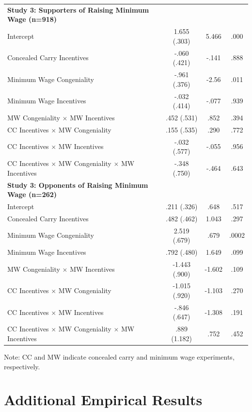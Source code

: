 \documentclass[12pt, letterpaper]{article}
\begin{document}
\begin{table}[ht]
\begin{tabular}{l c c c}
{\bf Study 3: Supporters of Raising Minimum Wage (n=918)}  & & & \\ 
  Intercept 									& 1.655 (.303) 	& 5.466 	& .000 \\ 
  Concealed Carry Incentives					& -.060 (.421) 	& -.141 	& .888 \\ 
  Minimum Wage Congeniality					& -.961 (.376) 	& -2.56 	& .011 \\ 
  Minimum Wage Incentives						& -.032 (.414) 	& -.077 	& .939 \\ 
  MW Congeniality $\times$ MW Incentives			& .452 (.531) 	& .852 	& .394 \\ 
  CC Incentives $\times$ MW Congeniality			& .155 (.535)	& .290 	& .772 \\ 
  CC Incentives $\times$ MW Incentives			& -.032 (.577) 	& -.055 	& .956 \\ 
  CC Incentives $\times$ MW Congeniality $\times$ MW Incentives 
										& -.348 (.750)	& -.464 	& .643 \\ \hline
{\bf Study 3: Opponents of Raising Minimum Wage (n=262)}  & & & \\ 
  Intercept 									& .211 (.326) 	& .648 	& .517 \\ 
  Concealed Carry Incentives					& .482 (.462) 	& 1.043 	& .297 \\ 
  Minimum Wage Congeniality					& 2.519 (.679) 	& .679 	& .0002 \\ 
  Minimum Wage Incentives						& .792 (.480) 	& 1.649 	& .099 \\ 
  MW Congeniality $\times$ MW Incentives			& -1.443 (.900) 	& -1.602 	& .109 \\ 
  CC Incentives $\times$ MW Congeniality			& -1.015 (.920)	& -1.103 	& .270 \\ 
  CC Incentives $\times$ MW Incentives			& -.846 (.647) 	& -1.308 	& .191 \\ 
  CC Incentives $\times$ MW Congeniality $\times$ MW Incentives 
										& .889 (1.182)	& .752 	& .452 \\ 
   \hline
\end{tabular}
Note: CC and MW indicate concealed carry and minimum wage experiments, respectively.
\end{table}
\normalsize
\doublespacing

\clearpage
\doublespacing
\section{Additional Empirical Results}
\end{document}
